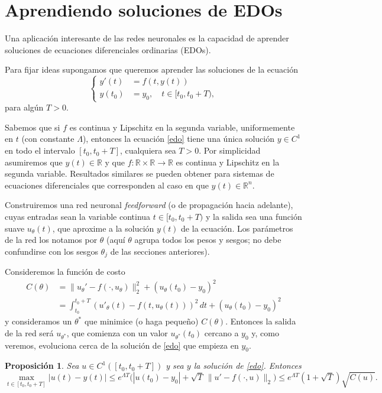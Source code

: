 \documentclass[12pt, a4paper]{amsbook}
\newcommand{\R}{{\mathbb R}}
\newtheorem{prop}[teo]{Proposici\'on}
\theoremstyle{remark}
\theoremstyle{definition}
\numberwithin{section}{chapter}
\numberwithin{subsection}{section}
\numberwithin{equation}{section}
\numberwithin{figure}{chapter}
\begin{document}
\section{Aprendiendo soluciones de EDOs}\label{sec.c9.4}

Una aplicación interesante de las redes neuronales es la capacidad de aprender soluciones de ecuaciones diferenciales ordinarias (EDOs).

Para fijar ideas supongamos que queremos aprender las soluciones de la ecuación
\begin{equation}\label{edo}
\begin{cases}
y'(t) &= f(t, y(t))\\
y(t_0) &= y_0,\quad t\in [t_0, t_0+T),
\end{cases}
\end{equation}
para algún $T>0$.

Sabemos que si $f$ es continua y Lipschitz en la segunda variable, uniformemente en $t$ (con constante $\Lambda$), entonces la ecuación \eqref{edo} tiene una única solución $y\in C^1$ en todo el intervalo $[t_0,t_0+T]$, cualquiera sea $T>0$. Por simplicidad asumiremos que $y(t)\in\R$ y que $f\colon \R\times\R\to\R$ es continua y Lipschitz en la segunda variable. Resultados similares se pueden obtener para sistemas de ecuaciones diferenciales que corresponden al caso en que $y(t)\in \R^n$.

Construiremos una red neuronal {\em feedforward} (o de propagación hacia adelante), cuyas entradas sean la variable continua $t\in [t_0, t_0+T)$ y la salida sea una función suave $u_\theta(t)$, que aproxime a la solución $y(t)$ de la ecuación. Los parámetros de la red los notamos por $\theta$ (aquí $\theta$ agrupa todos los pesos y sesgos; no debe confundirse con los sesgos $\theta_j$ de las secciones anteriores).

Consideremos la función de costo
\begin{align*}
C(\theta) &= \|u_\theta' - f(\cdot, u_\theta)\|_2^2 + (u_\theta(t_0) - y_0)^2\\
&= \int_{t_0}^{t_0+T} (u'_\theta(t) - f(t, u_\theta(t)))^2\, dt + (u_\theta(t_0) - y_0)^2
\end{align*}
y consideramos un $\theta^*$ que minimice (o haga pequeño) $C(\theta)$. Entonces la salida de la red será $u_{\theta^*}$, que comienza con un valor $u_{\theta^*}(t_0)$ cercano a $y_0$ y, como veremos, evoluciona cerca de la solución de \eqref{edo} que empieza en $y_0$.

\begin{prop}\label{prop.edo.estabilidad}
Sea $u\in C^1([t_0,t_0+T])$ y sea $y$ la solución de \eqref{edo}. Entonces
$$
\max_{t\in[t_0,t_0+T]}|u(t)-y(t)|\le e^{\Lambda T}\Big(|u(t_0)-y_0|+\sqrt T\,\|u'-f(\cdot,u)\|_2\Big)\le e^{\Lambda T}(1+\sqrt T)\sqrt{C(u)}.
$$
\end{prop}
\end{document}
